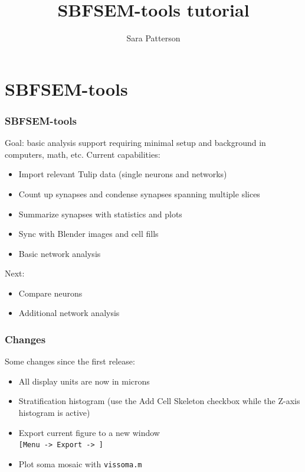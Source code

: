 \documentclass[11pt]{beamer}
\title{SBFSEM-tools tutorial}
\author{Sara Patterson}
\institute{University of Washington}
\begin{document}
	\maketitle
	\begin{frame}
		\tableofcontents
	\end{frame}
	\section{SBFSEM-tools}
\begin{frame}
	\frametitle{SBFSEM-tools}
	Goal: basic analysis support requiring minimal setup and background in computers, math, etc.
	\vskip10pt
	Current capabilities:
	\begin{itemize}
		\item Import relevant Tulip data (single neurons and networks)
		\item Count up synapses and condense synapses spanning multiple slices 
		\item Summarize synapses with statistics and plots
		\item Sync with Blender images and cell fills
		\item Basic network analysis
	\end{itemize}
	Next:\\
	\begin{itemize}
		\item Compare neurons
		\item Additional network analysis
	\end{itemize}
\end{frame}
\begin{frame}
	\frametitle{Changes}
	Some changes since the first release:
	\begin{itemize}
		\item All display units are now in microns
		\item Stratification histogram (use the Add Cell Skeleton checkbox while the Z-axis histogram is active)
		\item Export current figure to a new window\\ \texttt{[Menu -> Export -> ]}
		\item Plot soma mosaic with \texttt{vissoma.m}
	\end{itemize}
\end{frame}
\end{document}
